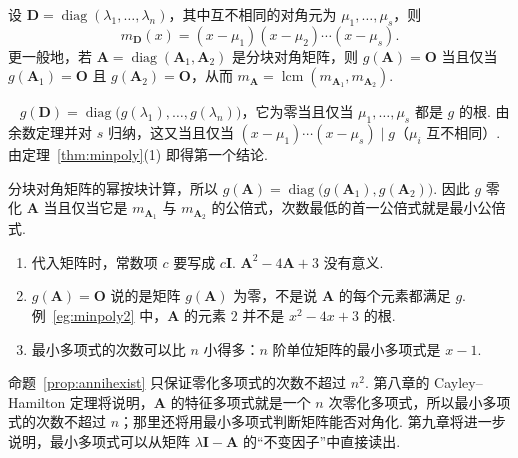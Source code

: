 \documentclass[lang=cn,10.5pt,scheme=chinese,toc=twocol,section,chinesefont=nofont,
twoside,citestyle=gb7714-2015,bibstyle=gb7714-2015]{elegantbook}
\DeclareRobustCommand{\textbf}[1]{{\lnsemiboldlatin\lnsemiboldcjk #1}}
\newcommand{\vv}[1]{\boldsymbol{#1}}
\numberwithin{equation}{section}   %
\newcommand{\diag}{\operatorname{diag}}
\newcommand*{\lnlabel}[1]{{\sffamily\bfseries\color{black}#1}}
\renewenvironment{proof}{%
	\par\noindent\lnlabel{\proofname}\;\ \color{black!90}\cfs}{\par}
\begin{document}
\begin{proposition}
  \label{prop:minpolydiag}
  设 $\vv D=\diag(\lambda_1,\ldots,\lambda_n)$，其中互不相同的对角元为 $\mu_1,\ldots,\mu_s$，则
  \[m_{\vv D}(x)=(x-\mu_1)(x-\mu_2)\cdots(x-\mu_s).\]
  更一般地，若 $\vv A=\diag(\vv A_1,\vv A_2)$ 是分块对角矩阵，则 $g(\vv A)=\vv O$ 当且仅当 $g(\vv A_1)=\vv O$ 且 $g(\vv A_2)=\vv O$，从而 $m_{\vv A}=\operatorname{lcm}(m_{\vv A_1},m_{\vv A_2})$.
\end{proposition}
\begin{proof}
  $g(\vv D)=\diag\big(g(\lambda_1),\ldots,g(\lambda_n)\big)$，它为零当且仅当 $\mu_1,\ldots,\mu_s$ 都是 $g$ 的根. 由余数定理并对 $s$ 归纳，这又当且仅当 $(x-\mu_1)\cdots(x-\mu_s)\mid g$（$\mu_i$ 互不相同）. 由定理~\ref{thm:minpoly}(1) 即得第一个结论.

  分块对角矩阵的幂按块计算，所以 $g(\vv A)=\diag\big(g(\vv A_1),g(\vv A_2)\big)$. 因此 $g$ 零化 $\vv A$ 当且仅当它是 $m_{\vv A_1}$ 与 $m_{\vv A_2}$ 的公倍式，次数最低的首一公倍式就是最小公倍式.
\end{proof}

\begin{pitfallbox}
  \begin{enumerate}
    \item 代入矩阵时，常数项 $c$ 要写成 $c\vv I$. $\vv A^2-4\vv A+3$ 没有意义.
    \item $g(\vv A)=\vv O$ 说的是矩阵 $g(\vv A)$ 为零，\textbf{不是}说 $\vv A$ 的每个元素都满足 $g$. 例~\ref{eg:minpoly2} 中，$\vv A$ 的元素 $2$ 并不是 $x^2-4x+3$ 的根.
    \item 最小多项式的次数可以比 $n$ 小得多：$n$ 阶单位矩阵的最小多项式是 $x-1$.
  \end{enumerate}
\end{pitfallbox}

命题~\ref{prop:annihexist} 只保证零化多项式的次数不超过 $n^2$. 第八章的 Cayley–Hamilton 定理将说明，$\vv A$ 的特征多项式就是一个 $n$ 次零化多项式，所以最小多项式的次数不超过 $n$；那里还将用最小多项式判断矩阵能否对角化. 第九章将进一步说明，最小多项式可以从矩阵 $\lambda\vv I-\vv A$ 的“不变因子”中直接读出.
\end{document}
